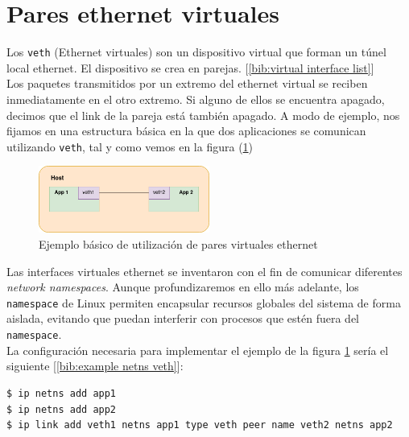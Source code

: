 \documentclass[a4paper, oneside, 12pt]{book}
\begin{document}
	\pagebreak
	
	\section{Pares ethernet virtuales}
	\label{sec: veth}
	\noindent Los \texttt{veth} (Ethernet virtuales) son un dispositivo virtual que forman un túnel local ethernet. El dispositivo se crea en parejas. [\ref{bib:virtual interface list}]\\
	
	\noindent Los paquetes transmitidos por un extremo del ethernet virtual se reciben inmediatamente en el otro extremo. Si alguno de ellos se encuentra apagado, decimos que el link de la pareja está también apagado. A modo de ejemplo, nos fijamos en una estructura básica en la que dos aplicaciones se comunican utilizando \texttt{veth}, tal y como vemos en la figura (\ref{ej1 veth})\\
	
	\begin{figure}[h]
		\begin{center}
			\includegraphics[width=0.5\textwidth]{img/veth_ej1.png}
			\caption{Ejemplo básico de utilización de pares virtuales ethernet}
			\label{ej1 veth}
		\end{center}
	\end{figure}

	\noindent Las interfaces virtuales ethernet se inventaron con el fin de comunicar diferentes \textit{network namespaces}. Aunque profundizaremos en ello más adelante, los \texttt{namespace} de Linux permiten encapsular recursos globales del sistema de forma aislada, evitando que puedan interferir con procesos que estén fuera del \texttt{namespace}.\\
	
	\noindent La configuración necesaria para implementar el ejemplo de la figura \ref{ej1 veth} sería el siguiente [\ref{bib:example netns veth}]:
	
	\begin{verbatim}
$ ip netns add app1
$ ip netns add app2
$ ip link add veth1 netns app1 type veth peer name veth2 netns app2
	\end{verbatim}
	
\end{document}
